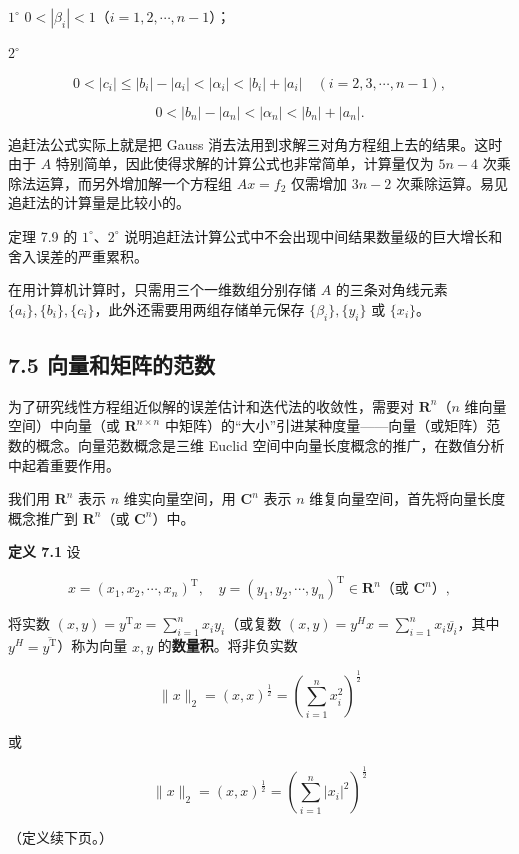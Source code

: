\documentclass[
  10pt,
  fontset=fandol]{ctexart}
\begin{document}
\(1^\circ\) \(0<|\beta_i|<1\)（\(i=1,2,\cdots,n-1\)）；

\(2^\circ\)

\[
0<|c_i|\leqslant|b_i|-|a_i|<|\alpha_i|<|b_i|+|a_i|\quad(i=2,3,\cdots,n-1),
\]

\[
0<|b_n|-|a_n|<|\alpha_n|<|b_n|+|a_n|.
\]

追赶法公式实际上就是把 Gauss
消去法用到求解三对角方程组上去的结果。这时由于 \(A\)
特别简单，因此使得求解的计算公式也非常简单，计算量仅为 \(5n-4\)
次乘除法运算，而另外增加解一个方程组 \(Ax=f_2\) 仅需增加 \(3n-2\)
次乘除运算。易见追赶法的计算量是比较小的。

定理 7.9 的 \(1^\circ\)、\(2^\circ\)
说明追赶法计算公式中不会出现中间结果数量级的巨大增长和舍入误差的严重累积。

在用计算机计算时，只需用三个一维数组分别存储 \(A\) 的三条对角线元素
\(\{a_i\},\{b_i\},\{c_i\}\)，此外还需要用两组存储单元保存
\(\{\beta_i\},\{y_i\}\) 或 \(\{x_i\}\)。

\subsection{7.5
向量和矩阵的范数}\label{ux5411ux91cfux548cux77e9ux9635ux7684ux8303ux6570}

为了研究线性方程组近似解的误差估计和迭代法的收敛性，需要对
\(\mathbf R^n\)（\(n\) 维向量空间）中向量（或 \(\mathbf R^{n\times n}\)
中矩阵）的``大小''引进某种度量------向量（或矩阵）范数的概念。向量范数概念是三维
Euclid 空间中向量长度概念的推广，在数值分析中起着重要作用。

我们用 \(\mathbf R^n\) 表示 \(n\) 维实向量空间，用 \(\mathbf C^n\) 表示
\(n\) 维复向量空间，首先将向量长度概念推广到 \(\mathbf R^n\)（或
\(\mathbf C^n\)）中。

\textbf{定义 7.1} 设

\[
x=(x_1,x_2,\cdots,x_n)^{\mathrm T},\quad y=(y_1,y_2,\cdots,y_n)^{\mathrm T}\in\mathbf R^n\text{（或 }\mathbf C^n\text{）},
\]

将实数 \((x,y)=y^{\mathrm T}x=\sum_{i=1}^{n}x_iy_i\)（或复数
\((x,y)=y^Hx=\sum_{i=1}^{n}x_i\overline{y_i}\)，其中
\(y^H=\overline{y^{\mathrm T}}\)）称为向量 \(x,y\)
的\textbf{数量积}。将非负实数

\[
\|x\|_2=(x,x)^{\frac12}=\left(\sum_{i=1}^{n}x_i^2\right)^{\frac12}
\]

或

\[
\|x\|_2=(x,x)^{\frac12}=\left(\sum_{i=1}^{n}|x_i|^2\right)^{\frac12}
\]

（定义续下页。）
\end{document}
